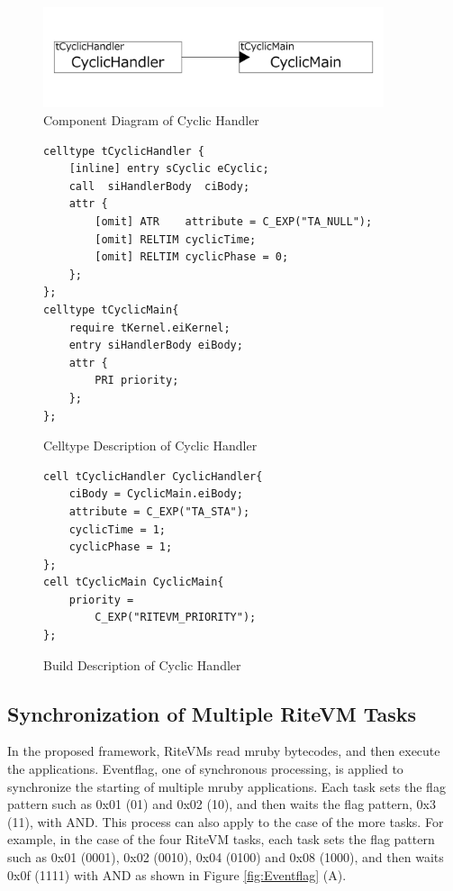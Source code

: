 \documentclass[a4j,12pt,oneside,openany,english]{jsbook}
\begin{document}
\begin{figure}[t]
    \centering
    \includegraphics[width=10cm,clip]{../EMSOFT2016/figure/cyclic_handler.pdf}
    \caption{Component Diagram of Cyclic Handler}
    \label{fig:cyclic_handler}
\end{figure}
\begin{figure}[t]
    \centering
    \begin{lstlisting}
celltype tCyclicHandler {
    [inline] entry sCyclic eCyclic;
    call  siHandlerBody  ciBody;
    attr {
    	[omit] ATR    attribute = C_EXP("TA_NULL");
    	[omit] RELTIM cyclicTime;
    	[omit] RELTIM cyclicPhase = 0;
    };
};
celltype tCyclicMain{
    require tKernel.eiKernel;
    entry siHandlerBody eiBody;
    attr {
        PRI priority;
    };
};
    \end{lstlisting}
    \caption{Celltype Description of Cyclic Handler}
    \label{celltype_cyclic_handler}
\end{figure}
\begin{figure}[t]
    \centering
    \begin{lstlisting}
cell tCyclicHandler CyclicHandler{
    ciBody = CyclicMain.eiBody;
    attribute = C_EXP("TA_STA");
    cyclicTime = 1;
    cyclicPhase = 1;
};
cell tCyclicMain CyclicMain{
    priority =
        C_EXP("RITEVM_PRIORITY");
};
   \end{lstlisting}
    \caption{Build Description of Cyclic Handler}
    \label{build_cyclic_handler}
\end{figure}
 
\subsection{Synchronization of Multiple RiteVM Tasks}

In the proposed framework, RiteVMs read mruby bytecodes, and then execute the applications.
Eventflag, one of synchronous processing, is applied to synchronize the starting of multiple mruby applications.
Each task sets the flag pattern such as 0x01 (01) and 0x02 (10), and then waits the flag pattern, 0x3 (11), with AND.
This process can also apply to the case of the more tasks.
For example, in the case of the four RiteVM tasks, each task sets the flag pattern such as 0x01 (0001), 0x02 (0010), 0x04 (0100)  and 0x08 (1000), and then waits 0x0f (1111) with AND as shown in Figure \ref{fig:Eventflag} (A).
\end{document}
